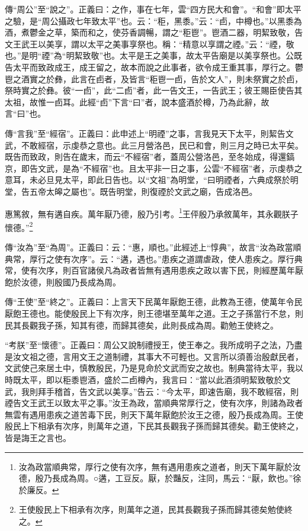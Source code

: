 {\noindent\zhuan{}\fzbyks 傳“周公”至“說之”。正義曰：之作，事在七年，雲“四方民大和會”。“和會”即太平之驗，是“周公攝政七年致太平”也。云：“秬，黑黍。”云：“卣，中樽也。”以黑黍為酒，煮鬱金之草，築而和之，使芬香調暢，謂之“秬鬯”。鬯酒二器，明絜致敬，告文王武王以美享，謂以太平之美事享祭也。稱：“精意以享謂之禋。”云：“禋，敬也。”是明“禋”為“明絜致敬”也。太平是王之美事，故太平告廟是以美享祭也。公既告太平而致政成王，成王留之，故本而說之此事者，欲令成王重其事，厚行之。鬱鬯之酒實之於彝，此言在卣者，及皆言“秬鬯一卣，告於文人”，則未祭實之於卣，祭時實之於彝。彼“一卣”，此“二卣”者，此一告文王，一告武王；彼王賜臣使告其太祖，故惟一卣耳。此經“卣”下言“曰”者，說本盛酒於樽，乃為此辭，故言“曰”也。 \par}

{\noindent\zhuan{}\fzbyks 傳“言我”至“經宿”。正義曰：此申述上“明禋”之事，言我見天下太平，則絜告文武，不敢經宿，示虔恭之意也。此三月營洛邑，民已和會，則三月之時已太平矣。既告而致政，則告在歲末，而云“不經宿”者，蓋周公營洛邑，至冬始成，得還鎬京，即告文武，是為“不經宿”也。且太平非一日之事，公雲“不經宿”者，示虔恭之意耳，未必旦見太平，即此日告也。以“文祖”為明堂，“曰明禋者，六典成祭於明堂，告五帝太皞之屬也”。既告明堂，則復禋於文武之廟，告成洛邑。 \par}

惠篤敘，無有遘自疾。萬年厭乃德，殷乃引考。\footnote{汝為政當順典常，厚行之使有次序，無有遇用患疾之道者，則天下萬年厭於汝德，殷乃長成為周。○遘，工豆反。厭，於豔反，注同，馬云：“厭，飲也。”徐於廉反。}王伻殷乃承敘萬年，其永觀朕子懷德。”\footnote{王使殷民上下相承有次序，則萬年之道，民其長觀我子孫而歸其德矣勉使終之。}

{\noindent\zhuan{}\fzbyks 傳“汝為”至“為周”。正義曰：云：“惠，順也。”此經述上“惇典”，故言“汝為政當順典常，厚行之使有次序”。云：“遘，遇也。”患疾之道謂虐政，使人患疾之。厚行典常，使有次序，則百官諸侯凡為政者皆無有遇用患疾之政以害下民，則經歷萬年厭飽於汝德，則殷國乃長成為周。 \par}

{\noindent\zhuan{}\fzbyks 傳“王使”至“終之”。正義曰：上言天下民萬年厭飽王德，此教為王德，使萬年令民厭飽王德也。能使殷民上下有次序，則王德堪至萬年之道。王之子孫當行不怠，則民其長觀我子孫，知其有德，而歸其德矣，此則長成為周。勸勉王使終之。 \par}

{\noindent\shu{}\fzkt “考朕”至“懷德”。正義曰：周公又說制禮授王，使王奉之。我所成明子之法，乃盡是汝文祖之德，言用文王之道制禮，其事大不可輕也。又言所以須善治殷獻民者，文武使己來居土中，慎教殷民，乃是見命於文武而安之故也。制典當待太平，我以時既太平，即以秬黍鬯酒，盛於二卣樽內，我言曰：“當以此酒須明絜致敬於文武，我則拜手稽首，告文武以美享。”告云：“今太平，即速告廟，我不敢經宿，則禋告文王武王以致太平之事。”汝王為政，當順典常厚行之，使有次序，則諸為政者無雲有遇用患疾之道苦毒下民，則天下萬年厭飽於汝王之德，殷乃長成為周。王使殷民上下相承有次序，則萬年之道，下民其長觀我子孫而歸其德矣。勸王使終之，皆是誨王之言也。 \par}

